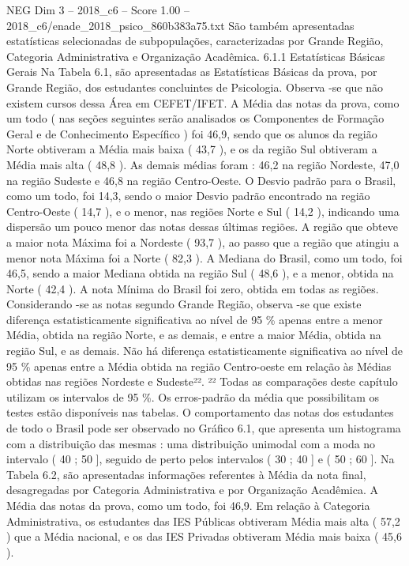 \begin{textsample}{NEG Dim 3 – 2018\_c6 – Score 1.00 – 2018\_c6/enade\_2018\_psico\_860b383a75.txt}
São também apresentadas estatísticas selecionadas de subpopulações, caracterizadas por Grande Região, Categoria Administrativa e Organização Acadêmica. 6.1.1 Estatísticas Básicas Gerais Na Tabela 6.1, são apresentadas as Estatísticas Básicas da prova, por Grande Região, dos estudantes concluintes de Psicologia.
Observa -se que não existem cursos dessa Área em CEFET/IFET.
A Média das notas da prova, como um todo ( nas seções seguintes serão analisados os Componentes de Formação Geral e de Conhecimento Específico ) foi 46,9, sendo que os alunos da região Norte obtiveram a Média mais baixa ( 43,7 ), e os da região Sul obtiveram a Média mais alta ( 48,8 ).
As demais médias foram : 46,2 na região Nordeste, 47,0 na região Sudeste e 46,8 na região Centro-Oeste.
O Desvio padrão para o Brasil, como um todo, foi 14,3, sendo o maior Desvio padrão encontrado na região Centro-Oeste ( 14,7 ), e o menor, nas regiões Norte e Sul ( 14,2 ), indicando uma dispersão um pouco menor das notas dessas últimas regiões.
A região que obteve a maior nota Máxima foi a Nordeste ( 93,7 ), ao passo que a região que atingiu a menor nota Máxima foi a Norte ( 82,3 ).
A Mediana do Brasil, como um todo, foi 46,5, sendo a maior Mediana obtida na região Sul ( 48,6 ), e a menor, obtida na Norte ( 42,4 ).
A nota Mínima do Brasil foi zero, obtida em todas as regiões.
Considerando -se as notas segundo Grande Região, observa -se que existe diferença estatisticamente significativa ao nível de 95 \% apenas entre a menor Média, obtida na região Norte, e as demais, e entre a maior Média, obtida na região Sul, e as demais.
Não há diferença estatisticamente significativa ao nível de 95 \% apenas entre a Média obtida na região Centro-oeste em relação às Médias obtidas nas regiões Nordeste e Sudeste²². ²² Todas as comparações deste capítulo utilizam os intervalos de 95 \%.
Os erros-padrão da média que possibilitam os testes estão disponíveis nas tabelas.
O comportamento das notas dos estudantes de todo o Brasil pode ser observado no Gráfico 6.1, que apresenta um histograma com a distribuição das mesmas : uma distribuição unimodal com a moda no intervalo ( 40 ; 50 ], seguido de perto pelos intervalos ( 30 ; 40 ] e ( 50 ; 60 ].
Na Tabela 6.2, são apresentadas informações referentes à Média da nota final, desagregadas por Categoria Administrativa e por Organização Acadêmica.
A Média das notas da prova, como um todo, foi 46,9.
Em relação à Categoria Administrativa, os estudantes das IES Públicas obtiveram Média mais alta ( 57,2 ) que a Média nacional, e os das IES Privadas obtiveram Média mais baixa ( 45,6 ).

\end{textsample}
